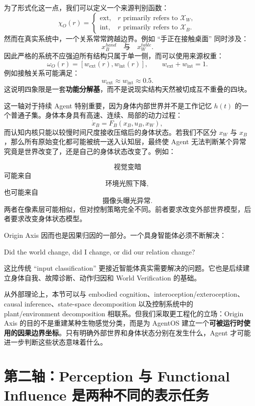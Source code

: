 为了形式化这一点，我们可以定义一个来源判别函数：
\[
\chi_O(r)
=
\begin{cases}
\mathrm{ext}, & r \text{ primarily refers to } \mathcal X_W,\\
\mathrm{int}, & r \text{ primarily refers to } \mathcal X_B.
\end{cases}
\]
然而在真实系统中，一个关系常常跨越边界。例如 ``手正在接触桌面'' 同时涉及：
\[
x_B^{hand}
\quad\text{与}\quad
x_W^{table}.
\]
因此严格的系统不应强迫所有结构只属于单一侧，而可以使用来源权重：
\[
\omega_O(r)
=
\left[
w_{\mathrm{ext}}(r),
w_{\mathrm{int}}(r)
\right],
\qquad
w_{\mathrm{ext}}+w_{\mathrm{int}}=1.
\]
例如接触关系可能满足：
\[
w_{\mathrm{ext}}\approx w_{\mathrm{int}}\approx 0.5.
\]
这说明四象限是一套\textbf{功能分解基}，而不是说现实结构天然被切成互不重叠的四块。

这一轴对于持续 Agent 特别重要，因为身体内部世界并不是工作记忆 $h(t)$ 的一个普通子集。身体本身具有高速、连续、局部的动力过程：
\[
\dot{x}_B
=
F_B(x_B,u_B,x_W),
\]
而认知内核只能以较慢时间尺度接收压缩后的身体状态。若我们不区分 $x_W$ 与 $x_B$，那么所有原始变化都可能被统一送入认知层，最终使 Agent 无法判断某个异常究竟是世界改变了，还是自己的身体状态改变了。例如：

\[
\text{视觉变暗}
\]
可能来自
\[
\text{环境光照下降},
\]
也可能来自
\[
\text{摄像头曝光异常}.
\]
两者在像素层可能相似，但对控制策略完全不同。前者要求改变外部世界模型，后者要求改变身体状态模型。

Origin Axis 因而也是因果归因的一部分。一个具身智能体必须不断解决：
\begin{statementbox}
Did the world change, did I change, or did our relation change?
\end{statementbox}
这比传统 ``input classification'' 更接近智能体真实需要解决的问题。它也是后续建立身体自我、故障诊断、动作归因和 World Verification 的基础。

从外部理论上，本节可以与 embodied cognition、interoception/exteroception、causal inference、state-space decomposition 以及控制系统中的 plant/environment decomposition 相联系。但我们采取更工程化的立场：Origin Axis 的目的不是重建某种生物感觉分类，而是为 AgentOS 建立一个\textbf{可被运行时使用的因果边界坐标}。只有明确外部世界和身体状态分别在发生什么，Agent 才可能进一步判断这些状态意味着什么。

\section{第二轴：Perception 与 Functional Influence 是两种不同的表示任务}
\label{sec:function-form-axis}

